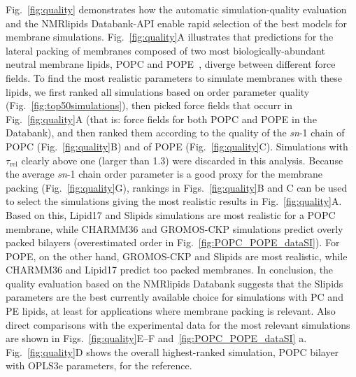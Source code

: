 \documentclass[fleqn,10pt]{wlscirep}
\begin{document}
Fig.~\ref{fig:quality} demonstrates how the automatic simulation-quality evaluation and the NMRlipids Databank-API enable rapid selection of the best models for membrane simulations. Fig.~\ref{fig:quality}A illustrates that predictions for the lateral packing of membranes composed of two most biologically-abundant neutral membrane lipids, POPC and POPE~\cite{vanmeer08},
diverge between different force fields. To find the most realistic parameters to simulate membranes with these lipids, we first ranked all simulations based on order parameter quality (Fig.~\ref{fig:top50simulations}), then picked force fields that occurr in Fig.~\ref{fig:quality}A (that is: force fields for both POPC and POPE in the Databank), and then ranked them according to the quality of the \textit{sn}-1 chain of POPC (Fig.~\ref{fig:quality}B) and of POPE (Fig.~\ref{fig:quality}C). Simulations with $\tau_\mathrm{rel}$ clearly above one (larger than 1.3) were discarded in this analysis. Because the average \textit{sn}-1 chain order parameter is a good proxy for the membrane packing (Fig.~\ref{fig:quality}G), rankings in Figs.~\ref{fig:quality}B and C can be used to select the simulations giving the most realistic results in Fig.~\ref{fig:quality}A. Based on this, Lipid17 and Slipids simulations are most realistic for a POPC membrane, while CHARMM36 and GROMOS-CKP simulations predict overly packed bilayers (overestimated order in Fig.~\ref{fig:POPC_POPE_dataSI}). For POPE, on the other hand, GROMOS-CKP and Slipids are most realistic, while CHARMM36 and Lipid17 predict too packed membranes. In conclusion, the quality evaluation based on the NMRlipids Databank suggests that the Slipids parameters are the best currently available choice for simulations with PC and PE lipids, at least for applications where membrane packing is relevant.
Also direct comparisons with the experimental data for the most relevant simulations are shown in Figs.~\ref{fig:quality}E--F and~\ref{fig:POPC_POPE_dataSI} a. Fig.~\ref{fig:quality}D shows the overall highest-ranked simulation, POPC bilayer with OPLS3e parameters, for the reference. 
\end{document}
